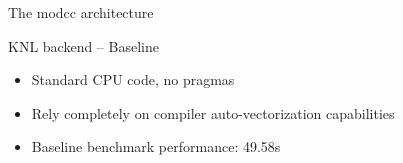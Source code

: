 \documentclass[aspectratio=1610,14pt]{beamer}
\begin{document}
\begin{frame}{The modcc architecture}
  \begin{center}
  \end{center}
\end{frame}

\begin{frame}{KNL backend -- Baseline}
  \begin{itemize}
  \item Standard CPU code, no pragmas
  \item Rely completely on compiler auto-vectorization capabilities
  \item Baseline benchmark performance: {\color{cscsred} 49.58s}
  \end{itemize}
\end{frame}
\end{document}
